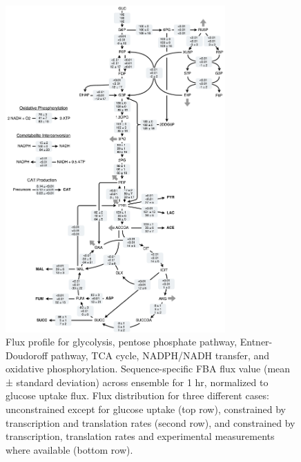 \documentclass[12pt]{article}
\begin{document}
\begin{figure}[ht]
\centering
\includegraphics[width=0.75\textwidth]{./Figures/CAT_flux_final.pdf}
\caption{Flux profile for glycolysis, pentose phosphate pathway, Entner-Doudoroff pathway, TCA cycle, NADPH/NADH transfer, and oxidative phosphorylation. Sequence-specific FBA flux value (mean ± standard deviation) across ensemble for 1 hr, normalized to glucose uptake flux. Flux distribution for three different cases: unconstrained except for glucose uptake (top row), constrained by transcription and translation rates (second row), and constrained by transcription, translation rates and experimental measurements where available (bottom row).}
\label{fig:Network}
\end{figure}
\end{document}
